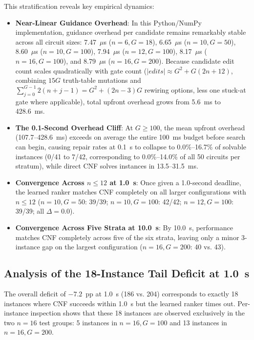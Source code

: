 \documentclass[11pt,a4paper]{article}
\begin{document}
This stratification reveals key empirical dynamics:
\begin{itemize}
    \item \textbf{Near-Linear Guidance Overhead}: In this Python/NumPy implementation, guidance overhead per candidate remains remarkably stable across all circuit sizes: 7.47~$\mu$s ($n=6, G=18$), 6.65~$\mu$s ($n=10, G=50$), 8.60~$\mu$s ($n=10, G=100$), 7.94~$\mu$s ($n=12, G=100$), 8.17~$\mu$s ($n=16, G=100$), and 8.79~$\mu$s ($n=16, G=200$). Because candidate edit count scales quadratically with gate count ($|edits| \approx G^2 + G(2n + 12)$, combining $15G$ truth-table mutations and $\sum_{j=0}^{G-1} 2(n + j - 1) = G^2 + (2n-3)G$ rewiring options, less one stuck-at gate where applicable), total upfront overhead grows from 5.6~ms to 428.6~ms.
    \item \textbf{The 0.1-Second Overhead Cliff}: At $G \ge 100$, the mean upfront overhead (107.7--428.6~ms) exceeds on average the entire 100~ms budget before search can begin, causing repair rates at 0.1~s to collapse to 0.0\%--16.7\% of solvable instances (0/41 to 7/42, corresponding to 0.0\%--14.0\% of all 50 circuits per stratum), while direct CNF solves instances in 13.5--31.5~ms.
    \item \textbf{Convergence Across $n \le 12$ at 1.0~s}: Once given a 1.0-second deadline, the learned ranker matches CNF completely on all larger configurations with $n \le 12$ ($n=10, G=50$: 39/39; $n=10, G=100$: 42/42; $n=12, G=100$: 39/39; all $\Delta = 0.0$).
    \item \textbf{Convergence Across Five Strata at 10.0~s}: By 10.0~s, performance matches CNF completely across five of the six strata, leaving only a minor 3-instance gap on the largest configuration ($n=16, G=200$: 40 vs. 43).
\end{itemize}

\subsection{Analysis of the 18-Instance Tail Deficit at 1.0~s}
The overall deficit of $-7.2$~pp at 1.0~s (186 vs. 204) corresponds to exactly 18 instances where CNF succeeds within 1.0~s but the learned ranker times out. Per-instance inspection shows that these 18 instances are observed exclusively in the two $n=16$ test groups: 5 instances in $n=16, G=100$ and 13 instances in $n=16, G=200$.
\end{document}

